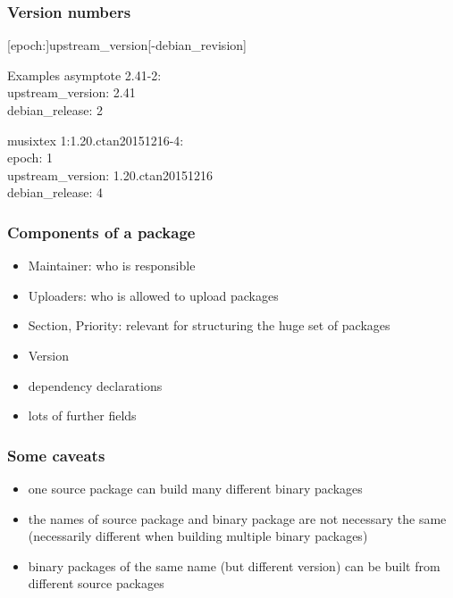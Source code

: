 \documentclass[hyperref]{beamer}
\def\bis{\\[\bigskipamount]}
\begin{document}
\begin{frame}
  \frametitle{Version numbers}
  \begin{center}
    [epoch:]upstream\_version[-debian\_revision] 
  \end{center}
  \begin{block}{Examples}
    asymptote 2.41-2:\\
    \hspace{1em}upstream\_version: 2.41\\
    \hspace{1em}debian\_release: 2

    \medskip\pause
    musixtex 1:1.20.ctan20151216-4:\\
    \hspace{1em} epoch: 1\\
    \hspace{1em} upstream\_version: 1.20.ctan20151216\\
    \hspace{1em} debian\_release: 4
  \end{block}
\end{frame}

\begin{frame}
  \frametitle{Components of a package}
  \begin{itemize}
  \item Maintainer: who is responsible\bis
  \item Uploaders: who is allowed to upload packages\bis
  \item Section, Priority: relevant for structuring the huge set of
    packages\bis
  \item Version\bis
  \item dependency declarations\bis
  \item lots of further fields
  \end{itemize}
\end{frame}

\begin{frame}
  \frametitle{Some caveats}
  \begin{itemize}
  \item one source package can build many different binary
    packages\bis 
  \item the names of source package and binary package are not
    necessary the same (necessarily different when building multiple
    binary packages)\bis
  \item binary packages of the same name (but different version) can
    be built from different source packages
  \end{itemize}
\end{frame}
\end{document}
